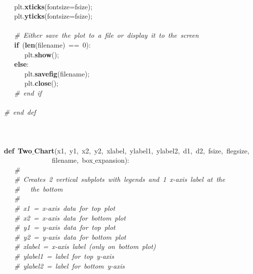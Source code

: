 \mbox{}\ \ \  \\
\mbox{}\ \ \ plt.\textbf{xticks}(fontsize=fsize); \\
\mbox{}\ \ \ plt.\textbf{yticks}(fontsize=fsize); \\
\mbox{}\ \ \  \\
\mbox{}\ \ \ \textit{\#\ Either\ save\ the\ plot\ to\ a\ file\ or\ display\ it\ to\ the\ screen} \\
\mbox{}\ \ \ \textbf{if}\ (\textbf{len}(filename)\ ==\ 0): \\
\mbox{}\ \ \ \ \ \ plt.\textbf{show}(); \\
\mbox{}\ \ \ \textbf{else}: \\
\mbox{}\ \ \ \ \ \ plt.\textbf{savefig}(filename); \\
\mbox{}\ \ \ \ \ \ plt.\textbf{close}(); \\
\mbox{}\ \ \ \textit{\#\ end\ if} \\
\mbox{}\ \ \  \\
\mbox{}\textit{\#\ end\ def} \\
\mbox{} \\
\mbox{} \\
\mbox{} \\
\mbox{}\textbf{def}\ \textbf{Two$\_$Chart}(x1,\ y1,\ x2,\ y2,\ xlabel,\ ylabel1,\ ylabel2,\ d1,\ d2,\ fsize,\ flegsize, \\
\mbox{}\ \ \ \ \ \ \ \ \ \ \ \ \ \ filename,\ box$\_$expansion): \\
\mbox{}\ \ \ \textit{\#} \\
\mbox{}\ \ \ \textit{\#\ Creates\ 2\ vertical\ subplots\ with\ legends\ and\ 1\ x-axis\ label\ at\ the} \\
\mbox{}\ \ \ \textit{\#\ \ \ the\ bottom} \\
\mbox{}\ \ \ \textit{\#} \\
\mbox{}\ \ \ \textit{\#\ x1\ =\ x-axis\ data\ for\ top\ plot} \\
\mbox{}\ \ \ \textit{\#\ x2\ =\ x-axis\ data\ for\ bottom\ plot} \\
\mbox{}\ \ \ \textit{\#\ y1\ =\ y-axis\ data\ for\ top\ plot} \\
\mbox{}\ \ \ \textit{\#\ y2\ =\ y-axis\ data\ for\ bottom\ plot} \\
\mbox{}\ \ \ \textit{\#\ xlabel\ =\ x-axis\ label\ (only\ on\ bottom\ plot)} \\
\mbox{}\ \ \ \textit{\#\ ylabel1\ =\ label\ for\ top\ y-axis} \\
\mbox{}\ \ \ \textit{\#\ ylabel2\ =\ label\ for\ bottom\ y-axis} \\

